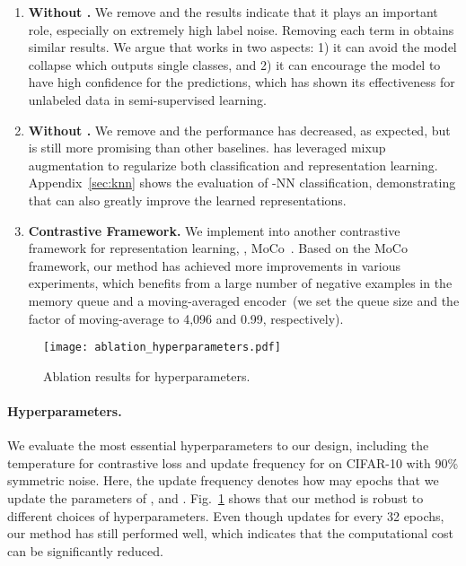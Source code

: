 \begin{enumerate}[label=\color{red!70!black}(\roman*),wide,labelindent=0pt,itemsep=0ex,parsep=0pt,topsep=0pt]
\item\label{bl_4} \textbf{Without .}\quad
We remove  and the results indicate that it plays an important role, especially on extremely high label noise. Removing each term in  obtains similar results. We argue that  works in two aspects: 1) it can avoid the model collapse which outputs single classes, and 2) it can encourage the model to have high confidence for the predictions, which has shown its effectiveness for unlabeled data in semi-supervised learning.
\item\label{bl_5} \textbf{Without .}\quad 
We remove  and the performance has decreased, as expected, but is still more promising than other baselines.  has leveraged mixup augmentation to regularize both classification and representation learning. Appendix~\ref{sec:knn} shows the evaluation of -NN classification, demonstrating that  can also greatly improve the learned representations.
\item\label{bl_6} \textbf{Contrastive Framework.}\quad
We implement \methodname into another contrastive framework for representation learning, \ie, MoCo~\cite{he2020momentum}. Based on the MoCo framework, our method has achieved more improvements in various experiments, which benefits from a large number of negative examples in the memory queue and a moving-averaged encoder~(we set the queue size and the factor of moving-average to 4,096 and 0.99, respectively).

\end{enumerate}


\begin{figure}
    \centering
    \texttt{[image: ablation\_hyperparameters.pdf]}
    \caption{
        Ablation results for hyperparameters.
    }
    \label{fig:ablation_hyperparameters}\end{figure}

\paragraph{Hyperparameters.}
We evaluate the most essential hyperparameters  to our design, including the temperature  for contrastive loss and update frequency for \methodname on CIFAR-10 with 90\% symmetric noise. Here, the update frequency denotes how may epochs that we update the parameters of \methodname,  and .
Fig.~\ref{fig:ablation_hyperparameters} shows that our method is robust to different choices of hyperparameters.
Even though \methodname updates for every 32 epochs, our method has still performed well, which indicates that the computational cost can be significantly reduced.

